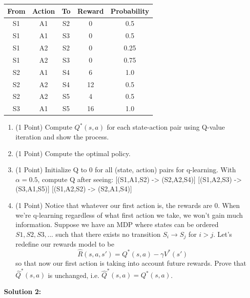 \documentclass[]{article}
\begin{document}
\begin{enumerate}[label=(\alph*)]
\begin{table}[htb]
    \centering
        \begin{tabular}{|c|c|c|c|c|}
          \hline
            From &	Action &	To &	Reward &	Probability \\\hline
            S1 &	A1 &	S2 &	0 &	0.5 \\\hline
            S1 &	A1 &	S3 &	0 &	0.5 \\\hline
            S1 &	A2 &	S2 &	0 &	0.25 \\\hline
            S1 &	A2 &	S3 &	0 &	0.75 \\\hline
            S2 &	A1 &	S4 &	6 &	1.0 \\\hline
            S2 &	A2 &	S4 &	12 &	0.5 \\\hline
            S2 &	A2 &	S5 &	4 &	0.5 \\\hline
            S3 &	A1 &	S5 &	16 &	1.0 \\\hline
        \end{tabular}
    \end{table}
    \begin{enumerate}[label=(\roman*)]
        \item (1 Point) Compute $Q^*(s,a)$ for each state-action pair using Q-value iteration and show the process.
        \item (1 Point) Compute the optimal policy.
        \item (1 Point) Initialize Q to 0 for all (state, action) pairs for q-learning. With $\alpha = 0.5$, compute Q after seeing:
        [(S1,A1,S2) -> (S2,A2,S4)] 
        [(S1,A2,S3) -> (S3,A1,S5)]
        [(S1,A2,S2) -> (S2,A1,S4)]
        \item (1 Point) Notice that whatever our first action is, the rewards are 0. When we're q-learning regardless of what first action we take, we won't gain much information. Suppose we have an MDP where states can be ordered $S1, S2, S3, ...$ such that there exists no transition $S_i \rightarrow S_j$ for $i > j$. Let's redefine our rewards model to be 
        $$\hat{R}(s,a,s') = Q^*(s,a) - \gamma V^*(s')$$
        so that now our first action is taking into account future rewards. Prove that $\hat{Q}^*(s,a)$ is unchanged, i.e. $\hat{Q}^*(s,a) = Q^*(s,a)$.
    \end{enumerate}
\end{enumerate}

\bigskip

\textbf{Solution 2:}

\clearpage
\end{document}
